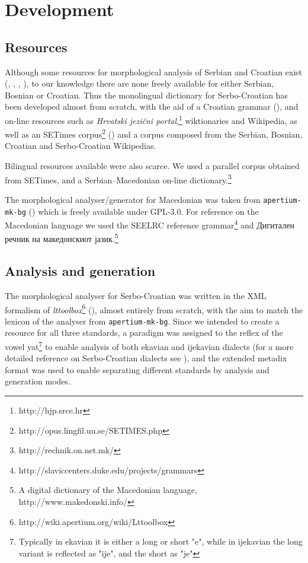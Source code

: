 \documentclass{book}
\begin{document}
\section{Development}
\subsection*{Resources}
Although some resources for morphological analysis of Serbian and Croatian exist
(\citealp{vitas2004intex}, \citealp{vitas2003processing}, \citealp{agic2008improving}, \citealp{snajder08automatic}), 
to our knowledge there are none freely available for either Serbian, Bosnian or 
Croatian. Thus the monolingual dictionary for Serbo-Croatian has been developed 
almost from scratch, with the aid of a Croatian grammar (\citealp{baric1997hrvatska}), 
and on-line resources such as \emph{Hrvatski jezični portal},\footnote{http://hjp.srce.hr}
wiktionaries and Wikipedia, as well as an SETimes corpus\footnote{http://opus.lingfil.uu.se/SETIMES.php} (\citealp{tyers2010south}) and a 
corpus composed from the Serbian, Bosnian, Croatian and Serbo-Croatian Wikipedias.

Bilingual resources available were also scarce. We used a parallel corpus obtained from
SETimes, and a Serbian--Macedonian on-line dictionary.\footnote{http://rechnik.on.net.mk/}

The morphological analyser/generator for Macedonian was taken from
{\small{\tt apertium-mk-bg}} (\citealp{rangelov2011rule}) which is freely available under GPL-3.0.
For reference on the Macedonian language we used the SEELRC reference grammar\footnote{http://slaviccenters.duke.edu/projects/grammars} and
Дигитален речник на македонскиот јазик.\footnote{A digital dictionary of the Macedonian language, http://www.makedonski.info/}

\subsection*{Analysis and generation}
The morphological analyser for Serbo-Croatian was written in the XML formalism of
\emph{lttoolbox}\footnote{http://wiki.apertium.org/wiki/Lttoolbox} (\citealp{rojas2005construccion}), almost entirely from scratch, with the
aim to match the lexicon of the analyser from {\small{\tt apertium-mk-bg}}. Since we intended to create a resource for all three
standards, a paradigm was assigned
to the reflex of the vowel yat\footnote{Typically in ekavian it is either a long or short "e", while in ijekavian the long variant is reflected as "ije", and the short as "je"} to enable analysis of both ekavian and ijekavian dialects (for a more detailed reference on Serbo-Croatian dialects see \citealp{brown2004handbook}), and the extended metadix format was used to enable separating different standards by
analysis and generation modes.
\end{document}
